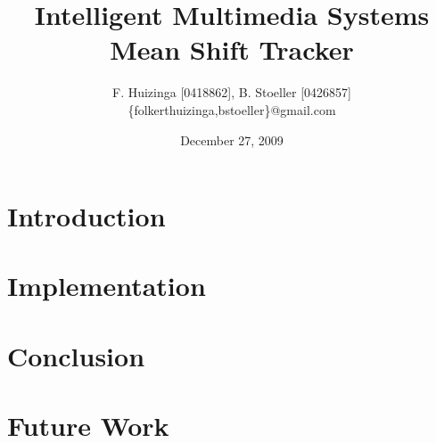 \documentclass[11pt]{article}
\title{Intelligent Multimedia Systems \\ Mean Shift Tracker}
\author{F. Huizinga [0418862], B. Stoeller [0426857] \\ \{folkerthuizinga,bstoeller\}@gmail.com}
\date{December 27, 2009}
\begin{document}
\maketitle

\begin{abstract}
\end{abstract}

\section*{Introduction}
\section*{Implementation}
\section*{Conclusion}
\section*{Future Work}
\end{document}
